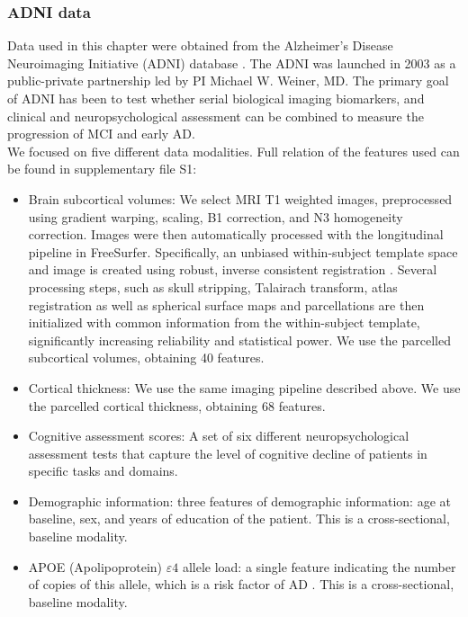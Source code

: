 \subsubsection{ADNI data}

Data used in this chapter were obtained from the Alzheimer’s Disease Neuroimaging Initiative (ADNI) database \cite{Mueller2005}. The ADNI was launched in 2003 as a public-private partnership led by PI Michael W. Weiner, MD. The primary goal of ADNI has been to test whether serial biological imaging biomarkers, and clinical and neuropsychological assessment can be combined to measure the progression of MCI and early AD. \\

We focused on five different data modalities. Full relation of the features used can be found in supplementary file S1: 

\begin{itemize}
    \item Brain subcortical volumes: We select MRI T1 weighted images, preprocessed using gradient warping, scaling, B1 correction, and N3 homogeneity correction. Images were then automatically processed with the longitudinal pipeline \cite{Reuter2012} in FreeSurfer. Specifically, an unbiased within-subject template space and image is created using robust, inverse consistent registration \cite{Reuter2010}. Several processing steps, such as skull stripping, Talairach transform, atlas registration as well as spherical surface maps and parcellations are then initialized with common information from the within-subject template, significantly increasing reliability and statistical power. We use the parcelled subcortical volumes, obtaining 40 features.
    \item Cortical thickness: We use the same imaging pipeline described above. We use the parcelled cortical thickness, obtaining 68 features.
    \item Cognitive assessment scores: A set of six different neuropsychological assessment tests that capture the level of cognitive decline of patients in specific tasks and domains. 
    \item Demographic information: three features of demographic information: age at baseline, sex, and years of education of the patient. This is a cross-sectional, baseline modality.
    \item APOE (Apolipoprotein) $\varepsilon4$ allele load: a single feature indicating the number of copies of this allele, which is a risk factor of AD \cite{Saunders1993}. This is a cross-sectional, baseline modality.
\end{itemize}

